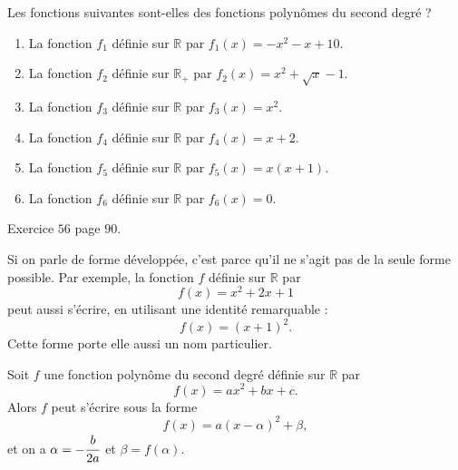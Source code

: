 \documentclass[11pt]{article}
\begin{document}
\begin{exo}
  Les fonctions suivantes sont-elles des fonctions polynômes du second degré ?
  \begin{enumerate}
    \item La fonction $f_1$ définie sur $\mathbb{R}$ par $f_1(x) = -x^2-x+10$.
    \item La fonction $f_2$ définie sur $\mathbb{R_+}$ par $f_2(x) = x^2+\sqrt x-1$.
    \item La fonction $f_3$ définie sur $\mathbb{R}$ par $f_3(x) = x^2$.
    \item La fonction $f_4$ définie sur $\mathbb{R}$ par $f_4(x) = x+2$.
    \item La fonction $f_5$ définie sur $\mathbb{R}$ par $f_5(x) = x(x+1)$.
    \item La fonction $f_6$ définie sur $\mathbb{R}$ par $f_6(x) = 0$.
  \end{enumerate}
\end{exo}
\begin{exo}
  Exercice $56$ page $90$.
\end{exo}
Si on parle de forme développée, c'est parce qu'il ne s'agit pas de la seule
forme possible. Par exemple, la fonction $f$ définie sur $\mathbb{R}$ par
\[
  f(x) = x^2+2x+1
\]
peut aussi s'écrire, en utilisant une identité remarquable :
\[
  f(x) = (x+1)^2.
\]
Cette forme porte elle aussi un nom particulier.


\begin{prop}
  Soit $f$ une fonction polynôme du second degré définie sur $\mathbb{R}$ par
  \[
    f(x) = ax^2+bx+c.
  \]
  Alors $f$ peut s'écrire sous la forme
  \[
    f(x) = a(x-\alpha)^2+\beta,
  \]
  et on a $\alpha=-\cfrac{b}{2a}$ et $\beta=f(\alpha)$.
\end{prop}
\end{document}
